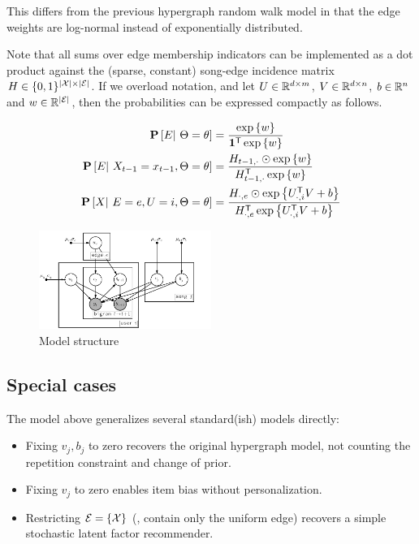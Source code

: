 \documentclass{article}
\def\E{\ensuremath{\mathcal{E}}}
\begin{document}
This differs from the previous hypergraph random walk model in that the edge weights are log-normal instead of exponentially distributed.  

Note that all sums over edge membership indicators can be implemented as a dot product against the (sparse, constant) 
song-edge incidence matrix $H \in \{0,1\}^{|\X| \times |\E|}$.  If we overload notation, and let $U \in \mathbb{R}^{d\times m}$, $V \in \mathbb{R}^{d \times n}$, $b \in \mathbb{R}^{n}$ and $w \in
\R^{|\E|}$, then the probabilities can be expressed compactly as follows.

\begin{align*}
\mathbf{P}\left[E |~ \Theta=\theta\right] &= \frac{\exp\left\{w\right\}}{\mathbf{1}^\mathsf{T} \exp\left\{w\right\}}\\
\mathbf{P}\left[E |~ X_{t-1}=x_{t-1}, \Theta=\theta\right] &= \frac{ H_{t-1, \cdot} \odot \exp\left\{w\right\} }{H_{t-1, \cdot}^\mathsf{T} \exp\left\{w\right\}}\\
\mathbf{P}\left[X |~ E=e, U=i, \Theta=\theta\right] &= \frac{ H_{\cdot, e} \odot \exp\left\{U_{\cdot,i}^\mathsf{T} V + b\right\} }{ H_{\cdot, e}^\mathsf{T} \exp\left\{U_{\cdot,i}^\mathsf{T} V + b\right\}}
\end{align*}

\begin{figure}
\centering
\includegraphics[width=0.5\textwidth]{model}
\caption{Model structure}
\end{figure}

\subsection{Special cases}
The model above generalizes several standard(ish) models directly:
\begin{itemize}
\item Fixing $v_j, b_j$ to zero recovers the original hypergraph model, not counting the repetition constraint and
change of prior.
\item Fixing $v_j$ to zero enables item bias without personalization.
\item Restricting $\E = \{ \X \}$ (\ie, contain only the uniform edge) recovers a simple stochastic latent factor recommender.
\end{itemize}
\end{document}

